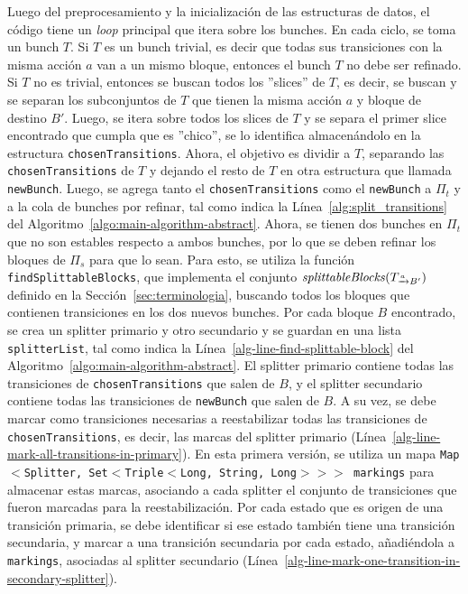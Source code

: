Luego del preprocesamiento y la inicialización de las estructuras de datos, el código tiene un \textit{loop} principal que itera sobre los bunches. En cada ciclo, se toma un bunch $T$. Si $T$ es un bunch trivial, es decir que todas sus transiciones con la misma acción $a$ van a un mismo bloque, entonces el bunch $T$ no debe ser refinado. Si $T$ no es trivial, entonces se buscan todos los ''slices'' de $T$, es decir, se buscan y se separan los subconjuntos de $T$ que tienen la misma acción $a$ y bloque de destino $B'$. Luego, se itera sobre todos los slices de $T$ y se separa el primer slice encontrado que cumpla que es ''chico'', se lo identifica almacenándolo en la estructura \texttt{chosenTransitions}. Ahora, el objetivo es dividir a $T$, separando las \texttt{chosenTransitions} de $T$ y dejando el resto de $T$ en otra estructura que llamada \texttt{newBunch}. Luego, se agrega tanto el \texttt{chosenTransitions} como el \texttt{newBunch} a $\Pi_t$ y a la cola de bunches por refinar, tal como indica la Línea~\ref{alg:split_transitions} del Algoritmo~\ref{algo:main-algorithm-abstract}. Ahora, se tienen dos bunches en $\Pi_t$ que no son estables respecto a ambos bunches, por lo que se deben refinar los bloques de $\Pi_s$ para que lo sean. Para esto, se utiliza la función \texttt{findSplittableBlocks}, que implementa el conjunto $\splittableBlocks(\TaB)$ definido en la Sección~\ref{sec:terminologia}, buscando todos los bloques que contienen transiciones en los dos nuevos bunches. Por cada bloque $B$ encontrado, se crea un splitter primario y otro secundario y se guardan en una lista \texttt{splitterList}, tal como indica la Línea~\ref{alg-line-find-splittable-block} del Algoritmo~\ref{algo:main-algorithm-abstract}. El splitter primario contiene todas las transiciones de \texttt{chosenTransitions} que salen de $B$, y el splitter secundario contiene todas las transiciones de \texttt{newBunch} que salen de $B$. A su vez, se debe marcar como transiciones necesarias a reestabilizar todas las transiciones de \texttt{chosenTransitions}, es decir, las marcas del splitter primario (Línea~\ref{alg-line-mark-all-transitions-in-primary}). En esta primera versión, se utiliza un mapa \texttt{Map$<$Splitter, Set$<$Triple$<$Long, \allowbreak String, Long$>$$>$$>$ markings} para almacenar estas marcas, asociando a cada splitter el conjunto de transiciones que fueron marcadas para la reestabilización. Por cada estado que es origen de una transición primaria, se debe identificar si ese estado también tiene una transición secundaria, y marcar a una transición secundaria por cada estado, añadiéndola a \texttt{markings}, asociadas al splitter secundario (Línea~\ref{alg-line-mark-one-transition-in-secondary-splitter}).

